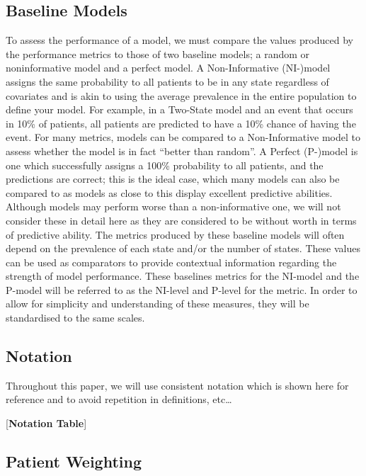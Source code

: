\documentclass[12pt,PhD,twoside,openright]{muthesis}
\begin{document}
\hypertarget{baseline-models}{%
\subsection{Baseline Models}\label{baseline-models}}

To assess the performance of a model, we must compare the values produced by the performance metrics to those of two baseline models; a random or noninformative model and a perfect model.
A Non-Informative (NI-)model assigns the same probability to all patients to be in any state regardless of covariates and is akin to using the average prevalence in the entire population to define your model. For example, in a Two-State model and an event that occurs in 10\% of patients, all patients are predicted to have a 10\% chance of having the event. For many metrics, models can be compared to a Non-Informative model to assess whether the model is in fact ``better than random''.
A Perfect (P-)model is one which successfully assigns a 100\% probability to all patients, and the predictions are correct; this is the ideal case, which many models can also be compared to as models as close to this display excellent predictive abilities. Although models may perform worse than a non-informative one, we will not consider these in detail here as they are considered to be without worth in terms of predictive ability.
The metrics produced by these baseline models will often depend on the prevalence of each state and/or the number of states. These values can be used as comparators to provide contextual information regarding the strength of model performance. These baselines metrics for the NI-model and the P-model will be referred to as the NI-level and P-level for the metric.
In order to allow for simplicity and understanding of these measures, they will be standardised to the same scales.

\hypertarget{notation}{%
\subsection{Notation}\label{notation}}

Throughout this paper, we will use consistent notation which is shown here for reference and to avoid repetition in definitions, etc\ldots{}

{[}\textbf{Notation Table}{]}

\hypertarget{patient-weighting}{%
\subsection{Patient Weighting}\label{patient-weighting}}
\end{document}

